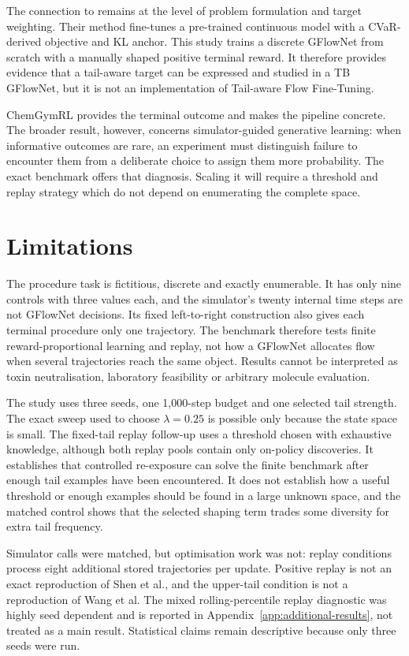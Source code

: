 \documentclass{article}
\begin{document}
The connection to \citet{wang2026tail} remains at the level of problem formulation and target weighting. Their method fine-tunes a pre-trained continuous model with a CVaR-derived objective and KL anchor. This study trains a discrete GFlowNet from scratch with a manually shaped positive terminal reward. It therefore provides evidence that a tail-aware target can be expressed and studied in a TB GFlowNet, but it is not an implementation of Tail-aware Flow Fine-Tuning.

ChemGymRL provides the terminal outcome and makes the pipeline concrete. The broader result, however, concerns simulator-guided generative learning: when informative outcomes are rare, an experiment must distinguish failure to encounter them from a deliberate choice to assign them more probability. The exact benchmark offers that diagnosis. Scaling it will require a threshold and replay strategy which do not depend on enumerating the complete space.

\section{Limitations}

The procedure task is fictitious, discrete and exactly enumerable. It has only nine controls with three values each, and the simulator's twenty internal time steps are not GFlowNet decisions. Its fixed left-to-right construction also gives each terminal procedure only one trajectory. The benchmark therefore tests finite reward-proportional learning and replay, not how a GFlowNet allocates flow when several trajectories reach the same object. Results cannot be interpreted as toxin neutralisation, laboratory feasibility or arbitrary molecule evaluation.

The study uses three seeds, one 1,000-step budget and one selected tail strength. The exact sweep used to choose $\lambda=0.25$ is possible only because the state space is small. The fixed-tail replay follow-up uses a threshold chosen with exhaustive knowledge, although both replay pools contain only on-policy discoveries. It establishes that controlled re-exposure can solve the finite benchmark after enough tail examples have been encountered. It does not establish how a useful threshold or enough examples should be found in a large unknown space, and the matched control shows that the selected shaping term trades some diversity for extra tail frequency.

Simulator calls were matched, but optimisation work was not: replay conditions process eight additional stored trajectories per update. Positive replay is not an exact reproduction of Shen et al., and the upper-tail condition is not a reproduction of Wang et al. The mixed rolling-percentile replay diagnostic was highly seed dependent and is reported in Appendix~\ref{app:additional-results}, not treated as a main result. Statistical claims remain descriptive because only three seeds were run.
\end{document}

